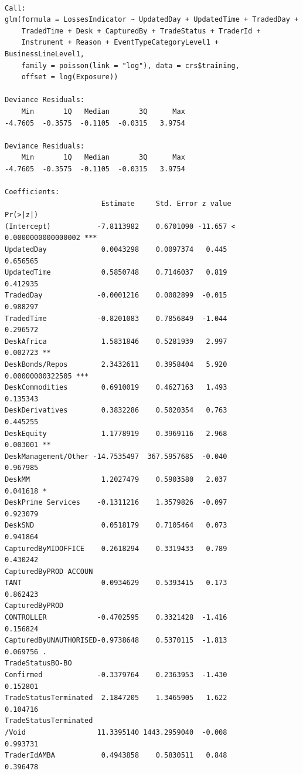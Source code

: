 \documentclass{DissertateUSU}
\begin{document}
\begin{verbatim}

Call:
glm(formula = LossesIndicator ~ UpdatedDay + UpdatedTime + TradedDay + 
    TradedTime + Desk + CapturedBy + TradeStatus + TraderId + 
    Instrument + Reason + EventTypeCategoryLevel1 + BusinessLineLevel1, 
    family = poisson(link = "log"), data = crs$training, 
    offset = log(Exposure))

Deviance Residuals: 
    Min       1Q   Median       3Q      Max  
-4.7605  -0.3575  -0.1105  -0.0315   3.9754  

Deviance Residuals: 
    Min       1Q   Median       3Q      Max  
-4.7605  -0.3575  -0.1105  -0.0315   3.9754  

Coefficients:
                       Estimate     Std. Error z value             Pr(>|z|)    
(Intercept)           -7.8113982    0.6701090 -11.657 < 0.0000000000000002 ***
UpdatedDay             0.0043298    0.0097374   0.445             0.656565    
UpdatedTime            0.5850748    0.7146037   0.819             0.412935    
TradedDay             -0.0001216    0.0082899  -0.015             0.988297    
TradedTime            -0.8201083    0.7856849  -1.044             0.296572    
DeskAfrica             1.5831846    0.5281939   2.997             0.002723 ** 
DeskBonds/Repos        2.3432611    0.3958404   5.920     0.00000000322505 ***
DeskCommodities        0.6910019    0.4627163   1.493             0.135343    
DeskDerivatives        0.3832286    0.5020354   0.763             0.445255    
DeskEquity             1.1778919    0.3969116   2.968             0.003001 ** 
DeskManagement/Other -14.7535497  367.5957685  -0.040             0.967985    
DeskMM                 1.2027479    0.5903580   2.037             0.041618 *  
DeskPrime Services    -0.1311216    1.3579826  -0.097             0.923079    
DeskSND                0.0518179    0.7105464   0.073             0.941864    
CapturedByMIDOFFICE    0.2618294    0.3319433   0.789             0.430242    
CapturedByPROD ACCOUN
TANT                   0.0934629    0.5393415   0.173             0.862423    
CapturedByPROD 
CONTROLLER            -0.4702595    0.3321428  -1.416             0.156824    
CapturedByUNAUTHORISED-0.9738648    0.5370115  -1.813             0.069756 .  
TradeStatusBO-BO 
Confirmed             -0.3379764    0.2363953  -1.430             0.152801    
TradeStatusTerminated  2.1847205    1.3465905   1.622             0.104716    
TradeStatusTerminated
/Void                 11.3395140 1443.2959040  -0.008             0.993731    
TraderIdAMBA           0.4943858    0.5830511   0.848             0.396478    

\end{verbatim}
\end{document}
